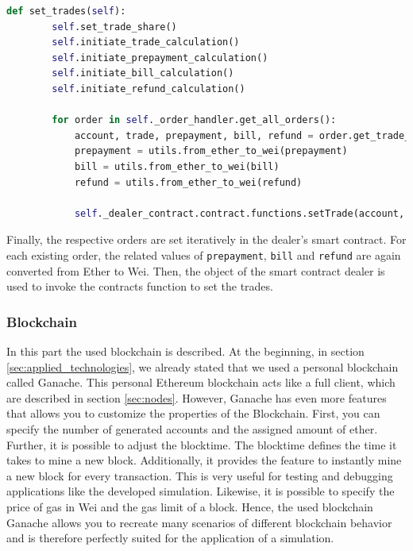 \begin{lstlisting}[float=htbp, label=lst:offchain_set_trades, caption=Submitment of trades, language=Python]
    def set_trades(self):
        self.set_trade_share()
        self.initiate_trade_calculation()
        self.initiate_prepayment_calculation()
        self.initiate_bill_calculation()
        self.initiate_refund_calculation()

        for order in self._order_handler.get_all_orders():
            account, trade, prepayment, bill, refund = order.get_trade_information()
            prepayment = utils.from_ether_to_wei(prepayment)
            bill = utils.from_ether_to_wei(bill)
            refund = utils.from_ether_to_wei(refund)

            self._dealer_contract.contract.functions.setTrade(account, trade, prepayment, bill, refund).transact({'from': self._account_address})
\end{lstlisting}

Finally, the respective orders are set iteratively in the dealer's smart contract. For each existing order, the related values of 
\verb|prepayment|, \verb|bill| and \verb|refund| are again converted from Ether to Wei. Then, the object of the smart 
contract dealer is used to invoke the contracts function to set the trades.


\subsubsection{Blockchain}
In this part the used blockchain is described. At the beginning, in section \ref{sec:applied_technologies}, we already
stated that we used a personal blockchain called Ganache. 
This personal Ethereum blockchain acts like a full client, which are described in section \ref{sec:nodes}.
However, Ganache has even more features that allows you to customize the properties of the Blockchain.
First, you can specify the number of generated accounts and the assigned amount of ether.
Further, it is possible to adjust the blocktime. The blocktime defines the time it takes to mine a new block. 
Additionally, it provides the feature to instantly mine a new block for every transaction. 
This is very useful for testing and debugging applications like the developed simulation.
Likewise, it is possible to specify the price of gas in Wei and the gas limit of a block. 
Hence, the used blockchain Ganache allows you to recreate many scenarios of different blockchain behavior
and is therefore perfectly suited for the application of a simulation.


